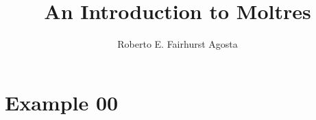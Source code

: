 \documentclass[11pt,letterpaper]{article}
\title{An Introduction to Moltres}
\author{Roberto E. Fairhurst Agosta}
\begin{document}
	\begin{titlepage}
		\maketitle
		\thispagestyle{empty}
	\end{titlepage}
	
\section{Example 00}

%
%
%
%
%
%
%
%
\end{document}
